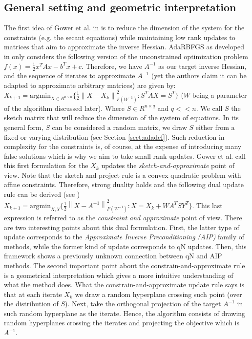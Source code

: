 \documentclass[12pt,conference,compsocconf]{IEEEtran}
\newcommand\norm[1]{\left\lVert#1\right\rVert}
\begin{document}
\subsection{General setting and geometric interpretation}\label{sect:framework}
The first idea of Gower et al. in \cite{Gower1,Gower2} is to reduce the dimension of the system for the constraints (e.g. the secant equations) while maintaining low rank updates to matrices that aim to approximate the inverse Hessian. AdaRBFGS as developed in \cite{Gower1} only considers the following version of the unconstrained optimization problem $f(x)=\frac{1}{2}x^TAx -b^Tx + c$.  Therefore, we have $A^{-1}$ as our target inverse Hessian, and the sequence of iterates to approximate $A^{-1}$ (yet the authors claim it can be adapted to approximate arbitrary matrices) are given by: 
$ X_{k+1} = \text{argmin}_{X \in R^{n\times n}} \{\frac{1}{2}\norm{X-X_k}_{F(W^{-1})}^2: S^TAX=S^T\}$ ($W$ being a parameter of the algorithm discussed later). Where $S \in R^{n\times q}$ and $q<<n$. We call $S$ the sketch matrix that will reduce the dimension of the system of equations. In its general form, $S$ can be considered a random matrix, we draw $S$ either from a fixed or varying distribution (see Section \ref{sect:adadef}). Such reduction in complexity for the constraints is, of course, at the expense of introducing many false solutions which is why we aim to take small rank updates. Gower et al. call this first formulation for the $X_k$ updates the \textit{sketch-and-approximate} point of view. Note that the sketch and project rule is a convex quadratic problem with affine constraints. Therefore, strong duality holds and the following dual update rule can be derived (see \cite{Gower1}) $X_{k+1} = \text{argmin}_{X,Y} \{\frac{1}{2}\norm{X-A^{-1}}_{F(W^{-1})}^2: X=X_k + WA^TSY^T\}$. This last expression is referred to as the \textit{constraint and approximate} point of view. There are two interesting points about this dual formulation. First, the latter type of update corresponds to the \textit{Approximate Inverse Preconditioning (AIP)} family of methods, while the former kind of update corresponds to qN updates. Then, this framework shows a previously unknown connection between qN and AIP methods. The second important point about the constrain-and-approximate rule is a geometrical interpretation which gives a more intuitive understanding of what the method does. What the constrain-and-approximate update rule says is that at each iterate $X_k$ we draw a random hyperplane crossing such point (over the distribution of $S$). Next, take the orthogonal projection of the target $A^{-1}$ in such random hyperplane as the iterate. Hence, the algorithm consists of drawing random hyperplanes crossing the iterates and projecting the objective which is $A^{-1}$.
\end{document}
